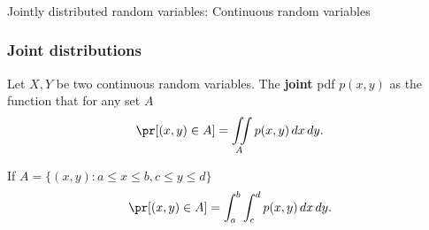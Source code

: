 


\begin{frame}[fragile]\frametitle{}
\begin{center}
{\Large Jointly distributed random variables: Continuous random variables }

\end{center}
\end{frame}




\begin{frame}[fragile]\frametitle{Joint distributions}

\begin{defn}
Let $X,Y$ be two continuous random variables. The {\bf joint} pdf 
$p(x,y)$ as the function that for any set $A$
$$\pr[(x,y) \in A] =  \iint \limits_A p(x,y) \, dx \, dy.$$ 

\vspace{.1in}
If $A=\{(x,y):a \leq x \leq b, c \leq y \leq d \}$
$$\pr[(x,y) \in A] = \int_a^b \int_c^d p(x,y) \, dx \, dy.$$ 
\end{defn}

\end{frame}



